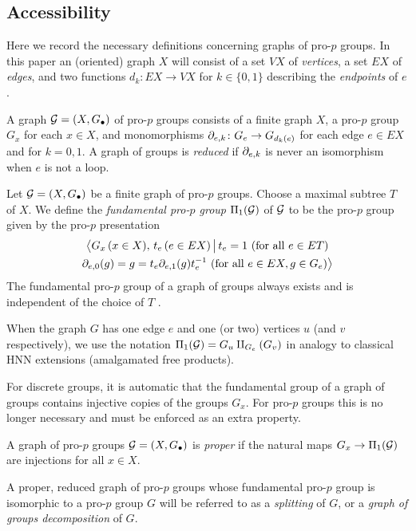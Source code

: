 \documentclass[draft, a4paper]{article}
\begin{document}
\subsection{Accessibility}\label{sec:AccessBg}
Here we record the necessary definitions concerning graphs of pro-$p$ groups.
In this paper an (oriented) graph $X$ will consist of a set $VX$ of {\em vertices}, a set $EX$ of {\em edges}, and two functions $d_k\colon EX\to VX$ for $k\in\{0,1\}$ describing the {\em endpoints} of $e$. 
\begin{defn}
A graph ${\cal G}=(X,G_\bullet)$ of pro-$p$ groups consists of a finite graph $X$, a pro-$p$ group $G_x$ for each $x\in X$, and monomorphisms $\partial_{e,k}\colon G_e\to G_{d_k(e)}$ for each edge $e\in EX$ and for $k=0,1$. A graph of groups is {\em reduced} if $\partial_{e,k}$ is never an isomorphism when $e$ is not a loop.
\end{defn}
Let ${\cal G}=(X,G_\bullet)$ be a finite graph of pro-$p$ groups. Choose a maximal subtree $T$ of $X$. We define the {\em fundamental pro-$p$ group} $\Pi_1(\cal G)$ of $\cal G$ to be the pro-$p$ group given by the pro-$p$ presentation
\begin{multline*}
\big<G_x\, (x\in X),\, t_e\, (e\in EX) \, \big| \, t_e=1 \text{ (for all }e\in ET)\\ \partial_{e,0}(g) = g = t_e\partial_{e,1}(g)t_e^{-1} \text{ (for all } e\in EX, g\in G_e)\big> 
\end{multline*}
The fundamental pro-$p$ group of a graph of groups always exists \cite[Proposition 6.2.1(b)]{Ribes17} and is independent of the choice of $T$ \cite[Theorem 6.2.4]{Ribes17}.

When the graph $G$ has one edge $e$ and one (or two) vertices $u$ (and $v$ respectively), we use the notation $\Pi_1({\cal G})= G_u\amalg_{G_e} (G_v)$ in analogy to classical HNN extensions (amalgamated free products).

For discrete groups, it is automatic that the fundamental group of a graph of groups contains injective copies of the groups $G_x$. For pro-$p$ groups this is no longer necessary and must be enforced as an extra property.
\begin{defn}
A graph of pro-$p$ groups ${\cal G}=(X,G_\bullet)$ is {\em proper} if the natural maps $G_x\to \Pi_1({\cal G})$ are injections for all $x\in X$.
\end{defn}
A proper, reduced graph of pro-$p$ groups whose fundamental pro-$p$ group is isomorphic to a pro-$p$ group $G$ will be referred to as a {\em splitting} of $G$, or a {\em graph of groups decomposition} of $G$.
\end{document}

